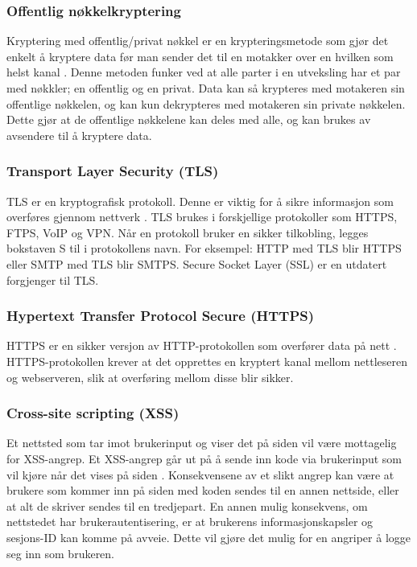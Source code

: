 \subsubsection{Offentlig nøkkelkryptering}
\label{sec:analysis-security-public_key-cryptography}
Kryptering med offentlig/privat nøkkel er en krypteringsmetode som gjør det enkelt å kryptere data før man sender det til en motakker over en hvilken som helst kanal \cite[s.~58-60]{NattTomHeine2015Datasikkerhet}. Denne metoden funker ved at alle parter i en utveksling har et par med nøkkler; en offentlig og en privat. Data kan så krypteres med motakeren sin offentlige nøkkelen, og kan kun dekrypteres med motakeren sin private nøkkelen. Dette gjør at de offentlige nøkkelene kan deles med alle, og kan brukes av avsendere til å kryptere data.
 
\subsubsection{Transport Layer Security (TLS)}
\label{sec:analysis-security-tls}
TLS er en kryptografisk protokoll. Denne er viktig for å sikre informasjon som overføres gjennom nettverk \cite{thomas2000ssl}. TLS brukes i forskjellige protokoller som HTTPS, FTPS, VoIP og VPN.
Når en protokoll bruker en sikker tilkobling, legges bokstaven S til i protokollens navn. For eksempel: HTTP med TLS blir HTTPS eller SMTP med TLS blir SMTPS.
Secure Socket Layer (SSL) er en utdatert forgjenger til TLS.
 
\subsubsection{Hypertext Transfer Protocol Secure (HTTPS)}
\label{sec:analysis-security-https}
HTTPS er en sikker versjon av HTTP-protokollen som overfører data på nett \cite{rfc26161999hypertext}. HTTPS-protokollen krever at det opprettes en kryptert kanal mellom nettleseren og webserveren, slik at overføring mellom disse blir sikker.

\subsubsection{Cross-site scripting (XSS)}
\label{sec:analysis-security-xss}
Et nettsted som tar imot brukerinput og viser det på siden vil være mottagelig for XSS-angrep.
Et XSS-angrep går ut på å sende inn kode via brukerinput som vil kjøre når det vises på siden \cite[s.~179-183]{NattTomHeine2015Datasikkerhet}. Konsekvensene av et slikt angrep kan være at brukere som kommer inn på siden med koden sendes til en annen nettside, eller at alt de skriver sendes til en tredjepart. En annen mulig konsekvens, om nettstedet har brukerautentisering, er at brukerens informasjonskapsler og sesjons-ID kan komme på avveie. Dette vil gjøre det mulig for en angriper å logge seg inn som brukeren.

